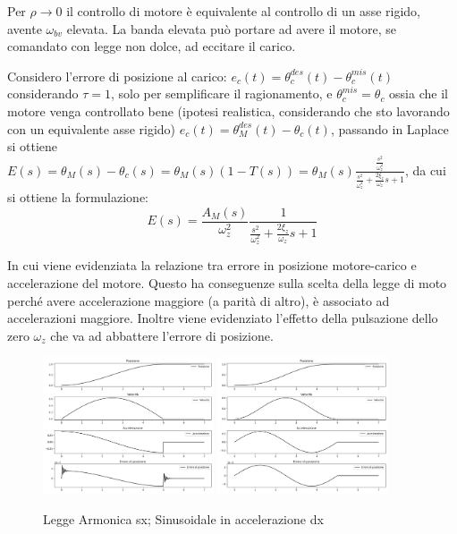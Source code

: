 Per \(\rho \rightarrow 0\) il controllo di motore è equivalente al controllo di un asse rigido, avente \(\omega_{bv}\) elevata. La banda elevata può portare ad avere il motore, se comandato con legge non dolce, ad eccitare il carico.

Considero l'errore di posizione al carico: \(e_c(t) = \theta_c^{des}(t) - \theta_c^{mis}(t)\) considerando \(\tau=1\), solo per semplificare il ragionamento, e \(\theta_c^{mis} = \theta_c\) ossia che il motore venga controllato bene (ipotesi realistica, considerando che sto lavorando con un equivalente asse rigido) \(e_c(t) = \theta_M^{des}(t) - \theta_c(t)\), passando in Laplace si ottiene \(E(s) = \theta_M (s) - \theta_c(s) = \theta_M(s) (1 - T(s)) = \theta_M(s) \frac{\frac{s^2}{\omega_z^2}}{\frac{s^2}{\omega_z^2} + \frac{2\xi_z}{\omega_z}s + 1}\), da cui si ottiene la formulazione:
\[
E(s) = \frac{A_M(s)}{\omega_z^2} \frac{1}{\frac{s^2}{\omega_z^2} + \frac{2\xi_z}{\omega_z}s + 1}
\]

In cui viene evidenziata la relazione tra errore in posizione motore-carico e accelerazione del motore. Questo ha conseguenze sulla scelta della legge di moto perché avere accelerazione maggiore (a parità di altro), è associato ad accelerazioni maggiore. Inoltre viene evidenziato l'effetto della pulsazione dello zero \(\omega_z\) che va ad abbattere l'errore di posizione.

\begin{figure}[h]
    \centering
    \includegraphics[width=0.45\textwidth]{Immagini/armonica_colocato_v.png}
    \includegraphics[width=0.45\textwidth]{Immagini/sinusoidale_colocato_v.png}
    \caption{Legge Armonica sx; Sinusoidale in accelerazione dx}
\end{figure}

